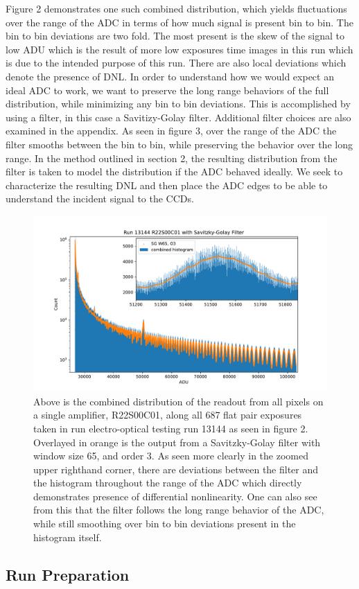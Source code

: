 \documentclass[11pt, letterpaper]{article}
\begin{document}
Figure 2 demonstrates one such combined distribution, which yields fluctuations over the range of the ADC in terms of how much signal is present bin to bin. 
The bin to bin deviations are two fold. 
The most present is the skew of the signal to low ADU which is the result of more low exposures time images in this run which is due to the intended purpose of this run. 
There are also local deviations which denote the presence of DNL. 
In order to understand how we would expect an ideal ADC to work, we want to preserve the long range behaviors of the full distribution, while minimizing any bin to bin deviations. 
This is accomplished by using a filter, in this case a Savitizy-Golay filter.
Additional filter choices are also examined in the appendix. 
As seen in figure 3, over the range of the ADC the filter smooths between the bin to bin, while preserving the behavior over the long range. 
In the method outlined in section 2, the resulting distribution from the filter is taken to model the distribution if the ADC behaved ideally. 
We seek to characterize the resulting DNL and then place the ADC edges to be able to understand the incident signal to the CCDs. 

\begin{figure}
    \centering
    \includegraphics[width=0.5\linewidth]{bar2.pdf}
    \caption{Above is the combined distribution of the readout from all pixels on a single amplifier, R22S00C01, along all 687 flat pair exposures taken in run electro-optical testing run 13144 as seen in figure 2. Overlayed in orange is the output from a Savitzky-Golay filter with window size 65, and order 3. As seen more clearly in the zoomed upper righthand corner, there are deviations between the filter and the histogram throughout the range of the ADC which directly demonstrates presence of differential nonlinearity. One can also see from this that the filter follows the long range behavior of the ADC, while still smoothing over bin to bin deviations present in the histogram itself.}
\end{figure}

\subsection{Run Preparation}
\indent
\end{document}
